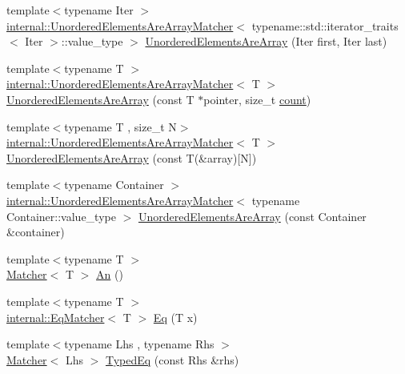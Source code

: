 \begin{DoxyCompactItemize}
\item 
{\footnotesize template$<$typename Iter $>$ }\\\hyperlink{classtesting_1_1internal_1_1UnorderedElementsAreArrayMatcher}{internal\+::\+Unordered\+Elements\+Are\+Array\+Matcher}$<$ typename\+::std\+::iterator\+\_\+traits$<$ Iter $>$\+::value\+\_\+type $>$ \hyperlink{namespacetesting_ab4896081406209171a1596b7028e1cf7}{Unordered\+Elements\+Are\+Array} (Iter first, Iter last)
\item 
{\footnotesize template$<$typename T $>$ }\\\hyperlink{classtesting_1_1internal_1_1UnorderedElementsAreArrayMatcher}{internal\+::\+Unordered\+Elements\+Are\+Array\+Matcher}$<$ T $>$ \hyperlink{namespacetesting_a99b9509a7cd405be28bf45231577384b}{Unordered\+Elements\+Are\+Array} (const T $\ast$pointer, size\+\_\+t \hyperlink{gmock__stress__test_8cc_afd9db40e3361ae09188795e8cbe19752}{count})
\item 
{\footnotesize template$<$typename T , size\+\_\+t N$>$ }\\\hyperlink{classtesting_1_1internal_1_1UnorderedElementsAreArrayMatcher}{internal\+::\+Unordered\+Elements\+Are\+Array\+Matcher}$<$ T $>$ \hyperlink{namespacetesting_a23c7729cfc61967f3271018076c4b724}{Unordered\+Elements\+Are\+Array} (const T(\&array)\mbox{[}N\mbox{]})
\item 
{\footnotesize template$<$typename Container $>$ }\\\hyperlink{classtesting_1_1internal_1_1UnorderedElementsAreArrayMatcher}{internal\+::\+Unordered\+Elements\+Are\+Array\+Matcher}$<$ typename Container\+::value\+\_\+type $>$ \hyperlink{namespacetesting_a72b0ee2217293106fcf4971dc4a59f4c}{Unordered\+Elements\+Are\+Array} (const Container \&container)
\item 
{\footnotesize template$<$typename T $>$ }\\\hyperlink{classtesting_1_1Matcher}{Matcher}$<$ T $>$ \hyperlink{namespacetesting_a48792471ff9cdf5b4f95a4242df7bfbb}{An} ()
\item 
{\footnotesize template$<$typename T $>$ }\\\hyperlink{classtesting_1_1internal_1_1EqMatcher}{internal\+::\+Eq\+Matcher}$<$ T $>$ \hyperlink{namespacetesting_a0cb8ba7eae844c871eccb29e7c81635f}{Eq} (T x)
\item 
{\footnotesize template$<$typename Lhs , typename Rhs $>$ }\\\hyperlink{classtesting_1_1Matcher}{Matcher}$<$ Lhs $>$ \hyperlink{namespacetesting_a57c9aba17aaa27d818e80a1eec81070f}{Typed\+Eq} (const Rhs \&rhs)

\end{DoxyCompactItemize}
